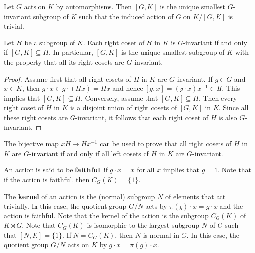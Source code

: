 \begin{exercise}
Let $G$ acts on $K$ by automorphisms. Then $[G,K]$ is the unique smallest $G$-invariant 
subgroup of $K$ such that the induced action of $G$ on $K/[G,K]$ is trivial. 	
\end{exercise}


\begin{proposition}
Let $H$ be a subgroup of $K$. Each right coset of $H$ in $K$ is $G$-invariant if and only if 
$[G,K]\subseteq H$. In particular, $[G,K]$ is the unique smallest subgroup of $K$ with the 
property that all its right cosets are $G$-invariant. 	
\end{proposition}

\begin{proof}
	Assume first that all right cosets of $H$ in $K$ are $G$-invariant. If $g\in G$ and $x\in K$, then
	$g\cdot x\in g\cdot (Hx)=Hx$ and hence $[g,x]=(g\cdot x)x^{-1}\in H$. This implies that $[G,K]\subseteq H$. 
	Conversely, assume that $[G,K]\subseteq H$. Then every right coset of $H$ in $K$ 
	is a disjoint union of right cosets of $[G,K]$ in $K$. 
	Since all these right cosets are $G$-invariant, it follows
	that each right coset of $H$ is also $G$-invariant. 	 
\end{proof}

The bijective map $xH\mapsto Hx^{-1}$ can be used to prove that all right cosets 
of $H$ in $K$ are $G$-invariant if and only if all left cosets of $H$ in $K$ are $G$-invariant. 

An action is said to be \textbf{faithful} if $g\cdot x=x$ for all $x$ implies that $g=1$. 
Note that if the action is faithful, then $C_G(K)=\{1\}$. 

The \textbf{kernel}
of an action is the (normal) subgroup $N$ of elements that act trivially. In this case, the quotient group
$G/N$ acts by $\pi(g)\cdot x=g\cdot x$ and the action is faithful. Note that
the kernel of the action 
is the subgroup $C_G(K)$ of $K\rtimes G$. Note that $C_G(K)$ is isomorphic to 
the largest subgroup $N$ of $G$ such that $[N,K]=\{1\}$. If $N=C_G(K)$, then $N$ is normal in $G$. In this case,
the quotient group $G/N$ acts on $K$ by $g\cdot x=\pi(g)\cdot x$. 


